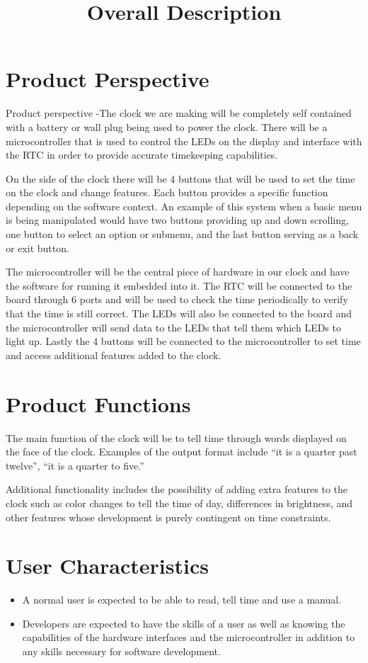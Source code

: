 \documentclass[10pt,draftclsnofoot,onecolumn]{IEEEtran}
\begin{document}
\newpage
\title{Overall Description}
\section{Product Perspective}
Product perspective -The clock we are making will be completely self contained with a battery 
or wall plug being used to power the clock. There will be a microcontroller that is used to 
control the LEDs on the display and interface with the RTC in order to provide accurate 
timekeeping capabilities.

On the side of the clock there will be 4 buttons that will be used to set the time on the 
clock and change features. Each button provides a specific function depending on the software 
context. An example of this system when a basic menu is being manipulated would have two 
buttons providing up and down scrolling, one button to select an option or submenu, and the 
last button serving as a back or exit button.

The microcontroller will be the central piece of hardware in our clock and have the software 
for running it embedded into it. The RTC will be connected to the board through 6 ports and 
will be used to check the time periodically to verify that the time is still correct. The LEDs 
will also be connected to the board and the microcontroller will send data to the LEDs that 
tell them which LEDs to light up. Lastly the 4 buttons will be connected to the 
microcontroller to set time and access additional features added to the clock. 

\section{Product Functions}
The main function of the clock will be to tell time through words displayed on the face of the 
clock. Examples of the output format include “it is a quarter past twelve”, “it is a quarter to
five.”

Additional functionality includes the possibility of adding extra features to the clock such as 
color changes to tell the time of day, differences in brightness, and other features whose 
development is purely contingent on time constraints.

\section{User Characteristics}
\begin{itemize}
  \item A normal user is expected to be able to read, tell time and use a manual.
  \item Developers are expected to have the skills of a user as well as knowing the 
  capabilities of the hardware interfaces and the microcontroller in addition to any skills 
  necessary for software development.
\end{itemize}
\end{document}

